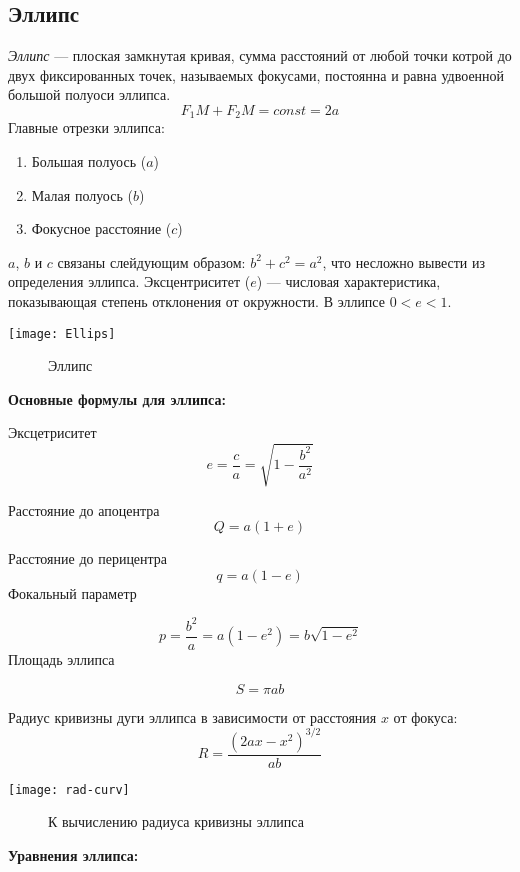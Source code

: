 \subsection{Эллипс}
\textsl{Эллипс} --- плоская замкнутая кривая, сумма расстояний от любой точки котрой до двух фиксированных точек, называемых фокусами, постоянна и равна удвоенной большой полуоси эллипса.
\begin{equation}F_1M+F_2M=const=2a
\end{equation}
Главные отрезки эллипса:
\begin{enumerate}
\item Большая полуось ($a$)
\item Малая полуось ($b$)
\item Фокусное расстояние ($c$)
\end{enumerate}
$a$, $b$ и $c$ связаны слейдующим образом: $b^2+c^2=a^2$, что несложно вывести из определения эллипса.
 Эксцентриситет ($e$) --- числовая характеристика, показывающая степень отклонения от окружности. В эллипсе $0<e<1$.
 \begin{center}
\texttt{[image: Ellips]}
\begin{figure}[h!]
\caption{Эллипс}
\end{figure}
\end{center}
\textbf{Основные формулы для эллипса:}

Эксцетриситет
\begin{equation}
e=\frac{c}{a}=\sqrt{1-\frac{b^2}{a^2}}
\end{equation}

Расстояние до апоцентра
\begin{equation}
Q=a(1+e)
\end{equation}

Расстояние до перицентра
\begin{equation}
q=a(1-e)
\end{equation}
Фокальный параметр

\begin{equation}
p=\frac{b^2}{a}=a(1-e^2)=b\sqrt{1-e^2}
\end{equation}
Площадь эллипса

\begin{equation}
S=\pi ab
\end{equation}

Радиус кривизны дуги эллипса в зависимости от расстояния $x$ от фокуса:
\begin{equation}
R=\frac{(2ax-x^2)^{3/2}}{ab}
\end{equation}
\begin{center}
\texttt{[image: rad-curv]}
\begin{figure}[!h]
\caption{К вычислению радиуса кривизны эллипса}
\end{figure}
\end{center}
\textbf{Уравнения эллипса:}

